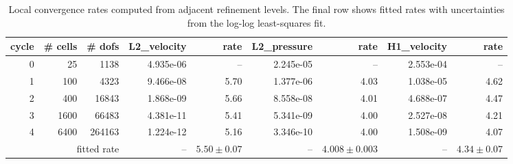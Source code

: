 \begin{table}[htbp]
\centering
\begin{tabular}{|r|r|r|r|r|r|r|r|r|}
\hline
cycle & \# cells & \# dofs & L2\_velocity & rate & L2\_pressure & rate & H1\_velocity & rate \\ \hline
0 & 25 & 1138 & 4.935e-06 & -- & 2.245e-05 & -- & 2.553e-04 & -- \\ \hline
1 & 100 & 4323 & 9.466e-08 & 5.70 & 1.377e-06 & 4.03 & 1.038e-05 & 4.62 \\ \hline
2 & 400 & 16843 & 1.868e-09 & 5.66 & 8.558e-08 & 4.01 & 4.688e-07 & 4.47 \\ \hline
3 & 1600 & 66483 & 4.381e-11 & 5.41 & 5.341e-09 & 4.00 & 2.527e-08 & 4.21 \\ \hline
4 & 6400 & 264163 & 1.224e-12 & 5.16 & 3.346e-10 & 4.00 & 1.508e-09 & 4.07 \\ \hline
\multicolumn{3}{|r|}{fitted rate} & -- & $5.50 \pm 0.07$ & -- & $4.008 \pm 0.003$ & -- & $4.34 \pm 0.07$ \\ \hline
\end{tabular}
\caption{Local convergence rates computed from adjacent refinement levels. The final row shows fitted rates with uncertainties from the log-log least-squares fit.}
\end{table}
